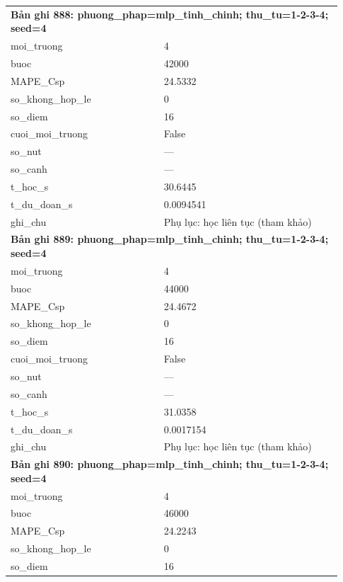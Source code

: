 \begin{longtable}{p{0.43\linewidth}p{0.50\linewidth}}
\midrule
\multicolumn{2}{p{0.95\linewidth}}{\textbf{Bản ghi 888: phuong\_phap=mlp\_tinh\_chinh; thu\_tu=1-2-3-4; seed=4}} \\
moi\_\allowbreak truong & 4 \\
buoc & 42000 \\
MAPE\_\allowbreak Csp & 24.5332 \\
so\_\allowbreak khong\_\allowbreak hop\_\allowbreak le & 0 \\
so\_\allowbreak diem & 16 \\
cuoi\_\allowbreak moi\_\allowbreak truong & False \\
so\_\allowbreak nut & — \\
so\_\allowbreak canh & — \\
t\_\allowbreak hoc\_\allowbreak s & 30.6445 \\
t\_\allowbreak du\_\allowbreak doan\_\allowbreak s & 0.0094541 \\
ghi\_\allowbreak chu & Phụ lục: học liên tục (tham khảo) \\
\midrule
\multicolumn{2}{p{0.95\linewidth}}{\textbf{Bản ghi 889: phuong\_phap=mlp\_tinh\_chinh; thu\_tu=1-2-3-4; seed=4}} \\
moi\_\allowbreak truong & 4 \\
buoc & 44000 \\
MAPE\_\allowbreak Csp & 24.4672 \\
so\_\allowbreak khong\_\allowbreak hop\_\allowbreak le & 0 \\
so\_\allowbreak diem & 16 \\
cuoi\_\allowbreak moi\_\allowbreak truong & False \\
so\_\allowbreak nut & — \\
so\_\allowbreak canh & — \\
t\_\allowbreak hoc\_\allowbreak s & 31.0358 \\
t\_\allowbreak du\_\allowbreak doan\_\allowbreak s & 0.0017154 \\
ghi\_\allowbreak chu & Phụ lục: học liên tục (tham khảo) \\
\midrule
\multicolumn{2}{p{0.95\linewidth}}{\textbf{Bản ghi 890: phuong\_phap=mlp\_tinh\_chinh; thu\_tu=1-2-3-4; seed=4}} \\
moi\_\allowbreak truong & 4 \\
buoc & 46000 \\
MAPE\_\allowbreak Csp & 24.2243 \\
so\_\allowbreak khong\_\allowbreak hop\_\allowbreak le & 0 \\
so\_\allowbreak diem & 16 \\

\end{longtable}
